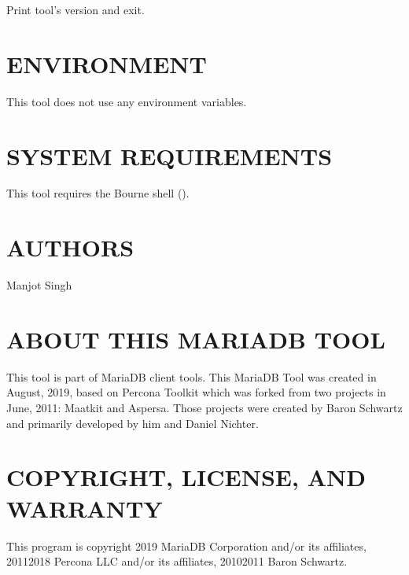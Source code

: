 \documentclass[letterpaper,10pt,english]{sphinxmanual}
\begin{document}

\begin{fulllineitems}
\label{\detokenize{mariadb-summary:cmdoption-mariadb-summary-version}}
\sphinxAtStartPar
Print tool’s version and exit.

\end{fulllineitems}



\section{ENVIRONMENT}
\label{\detokenize{mariadb-summary:environment}}
\sphinxAtStartPar
This tool does not use any environment variables.


\section{SYSTEM REQUIREMENTS}
\label{\detokenize{mariadb-summary:system-requirements}}
\sphinxAtStartPar
This tool requires the Bourne shell ().


\section{AUTHORS}
\label{\detokenize{mariadb-summary:authors}}
\sphinxAtStartPar
Manjot Singh


\section{ABOUT THIS MARIADB TOOL}
\label{\detokenize{mariadb-summary:about-this-mariadb-tool}}
\sphinxAtStartPar
This tool is part of MariaDB client tools. This MariaDB Tool was created in
August, 2019, based on Percona Toolkit which was
forked from two projects in June, 2011: Maatkit and Aspersa.  Those projects
were created by Baron Schwartz and primarily developed by him and Daniel Nichter.


\section{COPYRIGHT, LICENSE, AND WARRANTY}
\label{\detokenize{mariadb-summary:copyright-license-and-warranty}}
\sphinxAtStartPar
This program is copyright 2019 MariaDB Corporation and/or its affiliates,
2011\sphinxhyphen{}2018 Percona LLC and/or its affiliates, 2010\sphinxhyphen{}2011 Baron Schwartz.
\end{document}
